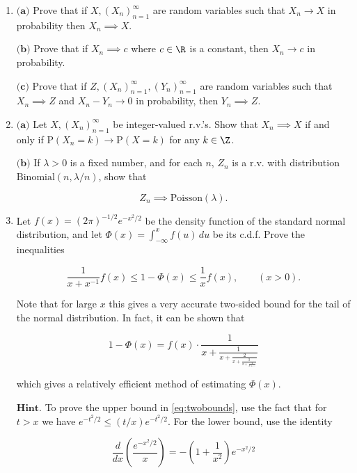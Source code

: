 \begin{enumerate}[label=\arabic*.]
\[
f_{\phi(U,V)}(w,z) = \frac{1}{|J_\phi(\phi^{-1}(w,z))|} f_{U,V}(\phi^{-1}(w,z))
\]

\noindent for the density of a transformed random $2$-d vector
to get the joint density of $W,Z$.

\item $\textbf{(a)}$ Prove that if $X, (X_n)_{n=1}^\infty$
are random variables such that $X_n \to X$ in
probability then $X_n \implies X$.

$\textbf{(b)}$ Prove that if $X_n \implies c$ where
$c\in \R$ is a constant, then $X_n \to c$ in
probability.

$\textbf{(c)}$ Prove that if
$Z, (X_n)_{n=1}^\infty, (Y_n)_{n=1}^\infty$ are
random variables such that $X_n \implies Z$ and
$X_n-Y_n\to 0$ in probability, then $Y_n \implies Z$.

\item $\textbf{(a)}$ Let $X, (X_n)_{n=1}^\infty$ be
integer-valued r.v.'s. Show that $X_n\implies X$ if
and only if $\mathrm{P}(X_n=k)\to \mathrm{P}(X=k)$
for any $k\in\Z$.

$\textbf{(b)}$ If $\lambda >0$ is a fixed number, and
for each $n$, $Z_n$ is a r.v. with distribution
$\textrm{Binomial}(n,\lambda/n)$, show that

\[
Z_n \implies \textrm{Poisson}(\lambda).
\]

\item Let $f(x) = (2\pi)^{-1/2} e^{-x^2/2}$ be the density
function of the standard normal distribution, and let
$\Phi(x) = \int_{-\infty}^x f(u)\,du$ be its c.d.f.
Prove the inequalities

\begin{equation*}
\tag{28}\label{eq:twobounds}
\frac{1}{x+x^{-1}}f(x) \le 1-\Phi(x) \le \frac{1}{x} f(x), \qquad (x>0).
\end{equation*}

\noindent Note that for large $x$ this gives a very accurate
two-sided bound for the tail of the normal
distribution. In fact, it can be shown that

\[
1-\Phi(x) = f(x) \cdot \frac{1}{x+\frac{1}{x+\frac{2}{x+\frac{3}{x+\frac{4}{x+\ldots}}}}}
\]

\noindent which gives a relatively efficient method of
estimating $\Phi(x)$.

$\textbf{Hint.}$ To prove the upper bound in
\eqref{eq:twobounds}, use the fact that for $t>x$ we have
$e^{-t^2/2} \le (t/x)e^{-t^2/2}$. For the lower
bound, use the identity

\[
\frac{d}{dx}\left(\frac{e^{-x^2/2}}{x}\right) = -\left(1+\frac{1}{x^2}\right) e^{-x^2/2}
\]


\end{enumerate}
